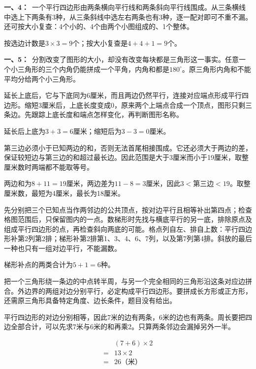 \documentclass[multi=snippet,border=0pt]{standalone}
\newenvironment{snippet}[3]{\begin{minipage}{#1bp}\color{answerred}\fontsize{#2}{#3}\selectfont\raggedright}{\end{minipage}}
\begin{document}
\begin{snippet}{505}{11.5}{14}\textbf{一、4：}\ 一个平行四边形由两条横向平行线和两条斜向平行线围成。从三条横线中选上下两条有3种，从三条斜线中选左右两条也有3种，逐一配对即可不重不漏。还可按大小复查：4个小的、4个由两个小图组成的、1个整体。\par 按选边计数是\(3\times3=9\)个；按大小复查是\(4+4+1=9\)个。\end{snippet}
\begin{snippet}{505}{11.5}{14}\textbf{一、5：}\ 分割改变了图形的大小，却没有改变每块都是三角形这一事实。任意一个小三角形的三个内角仍能拼成一个平角，内角和都是\(180^\circ\)。原三角形内角和不能平均分给两个小三角形。\end{snippet}
\begin{snippet}{505}{11.5}{14}延长上底后，它与下底同为6厘米，而且两边仍然平行，连接对应端点形成平行四边形。缩短3厘米后，上底长度变成0，原来两个上端点合成一个顶点，图形只剩三条边。先跟踪上底长度和端点怎样变化，再判断图形名称。\par 延长后上底为\(3+3=6\)厘米；缩短后为\(3-3=0\)厘米。\end{snippet}
\begin{snippet}{505}{11.5}{14}第三边必须小于已知两边的和，否则无法首尾相接围成。它还必须大于两边的差，保证较短边与第三边的和超过最长边。因此范围是大于3厘米而小于19厘米，取整厘米数时两端都不能取等号。\par 两边和为\(8+11=19\)厘米，两边差为\(11-8=3\)厘米，因此\(3<\text{第三边}<19\)。取整厘米数，最短为4厘米，最长为18厘米。\end{snippet}
\begin{snippet}{505}{11.5}{14}先分别把三个已知点当作两邻边的公共顶点，按对边平行且相等补出第四点；检查格图范围后，只保留图内的一点。数梯形时先找与横底平行的另一底，排除原点及组成平行四边形的点，再检查斜向两底的可能。格点列自左、排自上数：平行四边形补第2列第2排；梯形补第2排第1、3、4、6、7列，以及第7列第4排。斜放的最后一种也只有一组对边平行，不能漏数。\par 梯形补点的两类合计为\(5+1=6\)种。\end{snippet}
\begin{snippet}{505}{11.5}{14}把一个三角形绕一条边的中点转半周，与另一个完全相同的三角形沿这条对应边拼合。外边界的两组对边分别平行，必定构成平行四边形。要拼成长方形或正方形，还需原三角形具备特定角度、边长条件，题目没有给出。\end{snippet}
\begin{snippet}{505}{11.5}{14}平行四边形的对边分别相等，因此7米的边有两条，6米的边也有两条。周长要把四边全部合计，可以先求7米与6米的和再乘2。只算两条邻边会漏掉另外一半。\par \[\begin{aligned}&(7+6)\times2\\={}&13\times2\\={}&26\text{（米）}\end{aligned}\]\end{snippet}
\end{document}
